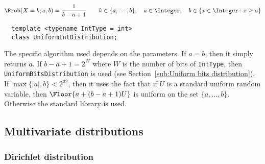 \begin{equation*}
  \Prob(X = k;a,b) = \frac{1}{b - a + 1} \qquad
  k \in \{a,\dots,b\},\quad
  a \in \Integer,\quad b \in \{x \in \Integer: x \ge a\}
\end{equation*}
\begin{Verbatim}
  template <typename IntType = int>
  class UniformIntDistribution;
\end{Verbatim}
The specific algorithm used depends on the parameters. If $a = b$, then it
simply returns $a$. If $b - a + 1 = 2^W$ where $W$ is the number of bits of
\verb|IntType|, then \verb|UniformBitsDistribution| is used (see
Section~\ref{sub:Uniform bits distribution}). If $\max\{|a|, b\} < 2^{32}$,
then it uses the fact that if $U$ is a standard uniform random variable, then
$\Floor{a + (b - a + 1) U}$ is uniform on the set $\{a,\dots,b\}$. Otherwise
the standard library is used.

\subsection{Multivariate distributions}
\label{sub:Multivariate distributions}

\subsubsection{Dirichlet distribution}

